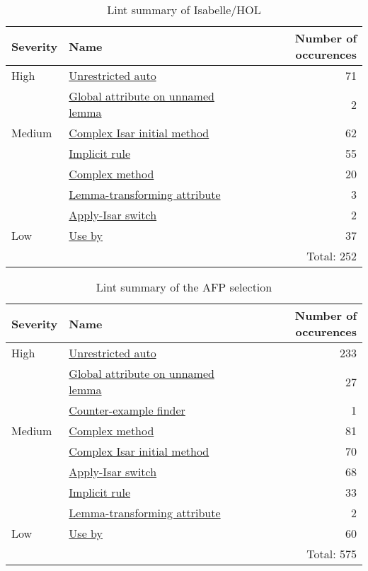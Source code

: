 \begin{table}
    \centering
    
\begin{tabular}{llr}
\toprule
Severity & Name & Number of occurences     \\
\midrule
High   & \hyperref[lint:unrestrictedauto]{Unrestricted auto} &  71 \\
       & \hyperref[lint:globalattr]{Global attribute on unnamed lemma} &   2 \\
Medium & \hyperref[lint:complexisar]{Complex Isar initial method} &  62 \\
       & \hyperref[lint:implicitrule]{Implicit rule} &   55 \\
       & \hyperref[lint:complexmethod]{Complex method} &   20 \\
       & \hyperref[lint:lemmatrans]{Lemma-transforming attribute} &   3 \\
       & \hyperref[lint:applyisarswitch]{Apply-Isar switch} &   2 \\
Low & \hyperref[lint:useby]{Use by} &  37 \\
\bottomrule
& & Total: 252

\end{tabular}
    \caption{Lint summary of Isabelle/HOL}
    \label{tab:hol-summary}
    
\end{table}
\begin{table}
    \centering
\begin{tabular}{llr}
\toprule
Severity & Name & Number of occurences      \\
\midrule
High  & \hyperref[lint:unrestrictedauto]{Unrestricted auto} &  233 \\
      & \hyperref[lint:globalattr]{Global attribute on unnamed lemma} &   27 \\
      & \hyperref[lint:counterexample]{Counter-example finder} &    1 \\
Medium & \hyperref[lint:complexmethod]{Complex method} &   81 \\
       & \hyperref[lint:complexisar]{Complex Isar initial method} &   70 \\
       & \hyperref[lint:applyisarswitch]{Apply-Isar switch} &   68 \\
       & \hyperref[lint:implicitrule]{Implicit rule} &   33 \\
       & \hyperref[lint:lemmatrans]{Lemma-transforming attribute} &    2 \\
Low & \hyperref[lint:useby]{Use by} &   60 \\
\bottomrule
& & Total: 575
\end{tabular}
    \caption{Lint summary of the AFP selection}
    \label{tab:afp-summary}
\end{table}

